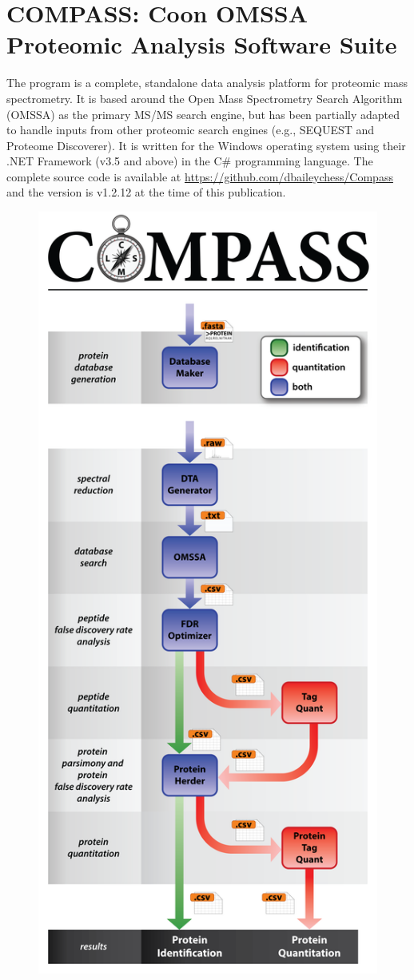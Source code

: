 \section{COMPASS: Coon OMSSA Proteomic Analysis Software Suite}
The \compass{} program is a complete, standalone data analysis platform for proteomic mass spectrometry. It is based around the Open Mass Spectrometry Search Algorithm (OMSSA) as the primary MS/MS search engine, but has been partially adapted to handle inputs from other proteomic search engines (e.g., SEQUEST and Proteome Discoverer).\cite{sequest} It is written for the Windows operating system using their .NET Framework (v3.5 and above) in the C\# programming language. The complete source code is available at \url{https://github.com/dbaileychess/Compass} and the version is v1.2.12 at the time of this publication.
\begin{figure}[p]
	\centering
	\includegraphics[width=0.5\columnwidth]{csmsl/compass.png}
	\label{fig:compass}
\end{figure}
